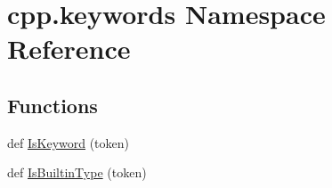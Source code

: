 \hypertarget{namespacecpp_1_1keywords}{}\section{cpp.\+keywords Namespace Reference}
\label{namespacecpp_1_1keywords}
\subsection*{Functions}
\begin{DoxyCompactItemize}
\item 
def \hyperlink{namespacecpp_1_1keywords_ab9edc2cbd4a9d5ad58a1c0ad3281cbc9}{Is\+Keyword} (token)
\item 
def \hyperlink{namespacecpp_1_1keywords_ae0f7a581fef26ad1a71c59bd963ee285}{Is\+Builtin\+Type} (token)
\end{DoxyCompactItemize}
